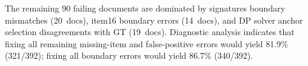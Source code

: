 \documentclass[11pt,a4paper]{article}
\begin{document}
\noindent
The remaining 90 failing documents are dominated by signatures boundary mismatches (20~docs), item16 boundary errors (14~docs), and DP solver anchor selection disagreements with GT (19~docs). Diagnostic analysis indicates that fixing all remaining missing-item and false-positive errors would yield 81.9\% (321/392); fixing all boundary errors would yield 86.7\% (340/392).
\end{document}
